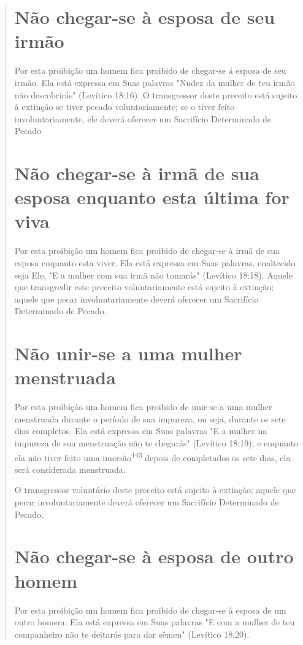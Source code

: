 \begin{quote}
\section{Não chegar-se à esposa de seu irmão}

Por esta proibição um homem fica proibido de chegar-se á esposa de seu
irmão. Ela está expressa em Suas palavras "Nudez da mulher de teu ir­mão
não descobrirás" (Levítico 18:16). O transgressor deste preceito está
sujei­to à extinção se tiver pecado voluntariamente; se o tiver feito
involuntariamen­te, ele deverá oferecer um Sacrifício Determinado de
Pecado

\section{Não chegar-se à irmã de sua esposa enquanto esta última for viva}

Por esta proibição um homem fica proibido de chegar-se à irmã de sua
esposa enquanto esta viver. Ela está expressa em Suas palavras,
enaltecido seja Ele, "E a mulher com sua irmã não tomarás" (Levítico
18:18). Aquele que transgredir este preceito voluntariamente está
sujeito à extinção; aquele que pe­car involuntariamente deverá oferecer
um Sacrifício Determinado de Pecado.

\section{Não unir-se a uma mulher menstruada}

Por esta proibição um homem fica proibido de unir-se a uma mu­lher
menstruada durante o período de sua impureza, ou seja, durante os sete
dias completos. Ela está expressa em Suas palavras "E a mulher na impureza de
sua menstruação não te chegarás" (Levítico 18:19); e enquanto ela não
tiver feito uma imersão\textsuperscript{443} depois de completados os
sete dias, ela será considerada menstruada.

O transgressor voluntário deste preceito está sujeito à extinção; aquele
que pecar involuntariamente deverá oferecer um Sacrifício Determinado de
Pecado.

\section{Não chegar-se à esposa de outro homem}

Por esta proibição um homem fica proibido de chegar-se à esposa de um
outro homem. Ela está expressa em Suas palavras "E com a mulher de teu
companheiro não te deitarás para dar sêmen" (Levítico 18:20).


\end{quote}
